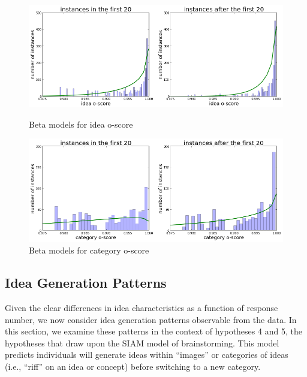 
\begin{figure}[h]
    \centering
    \includegraphics[width=0.9\columnwidth]{hyp4_ideas}
    \caption{Beta models for idea o-score}
    \label{fig:idea_oscore_hyp4}
    \includegraphics[width=0.9\columnwidth]{hyp4_cats}
    \caption{Beta models for category o-score}
    \label{fig:cat_oscore_hyp4}
\end{figure}






\subsection{Idea Generation Patterns}
Given the clear differences in idea characteristics as a function of response number, we now consider idea generation patterns observable from the data. In this section, we examine these patterns in the context of hypotheses 4 and 5, the hypotheses that draw upon the SIAM model of brainstorming. This model predicts individuals will generate ideas within ``images'' or categories of ideas (i.e., ``riff'' on an idea or concept) before switching to a new category.

